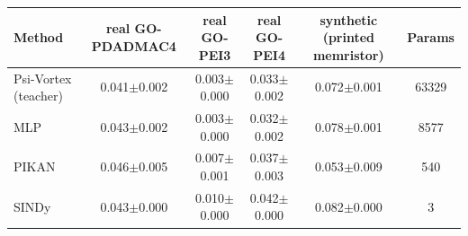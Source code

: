 \begin{tabular}{lccccc}
\toprule
Method & real GO-PDADMAC4 & real GO-PEI3 & real GO-PEI4 & synthetic (printed memristor) & Params \\
\midrule
Psi-Vortex (teacher) & 0.041$\pm$0.002 & 0.003$\pm$0.000 & 0.033$\pm$0.002 & 0.072$\pm$0.001 & 63329 \\
MLP & 0.043$\pm$0.002 & 0.003$\pm$0.000 & 0.032$\pm$0.002 & 0.078$\pm$0.001 & 8577 \\
PIKAN & 0.046$\pm$0.005 & 0.007$\pm$0.001 & 0.037$\pm$0.003 & 0.053$\pm$0.009 & 540 \\
SINDy & 0.043$\pm$0.000 & 0.010$\pm$0.000 & 0.042$\pm$0.000 & 0.082$\pm$0.000 & 3 \\
\bottomrule
\end{tabular}

